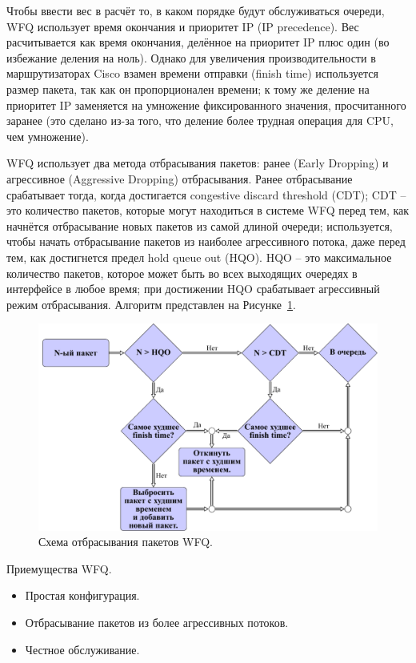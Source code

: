     Чтобы ввести вес в расчёт то, в каком порядке будут обслуживаться очереди,
    WFQ использует время окончания и приоритет IP (IP precedence). Вес расчитывается
    как время окончания, делённое на приоритет IP плюс один (во избежание деления
    на ноль). Однако для увеличения производительности в маршрутизаторах Cisco
    взамен времени отправки (finish time) используется размер пакета, так как он
    пропорционален времени; к тому же деление на приоритет IP заменяется на умножение
    фиксированного значения, просчитанного заранее (это сделано из-за того,
    что деление более трудная операция для CPU, чем умножение).\cite{Vagesna}

    WFQ использует два метода отбрасывания пакетов: ранее (Early Dropping) и агрессивное
    (Aggressive Dropping) отбрасывания. Ранее отбрасывание срабатывает тогда, когда
    достигается congestive discard threshold (CDT); CDT -- это количество пакетов, которые могут
    находиться в системе WFQ перед тем, как начнётся отбрасывание новых пакетов
    из самой длиной очереди; используется, чтобы начать отбрасывание пакетов
    из наиболее агрессивного потока, даже перед тем, как достигнется предел
    hold queue out (HQO). HQO -- это максимальное количество пакетов, которое может быть
    во всех выходящих очередях в интерфейсе в любое время; при достижении HQO
    срабатывает агрессивный режим отбрасывания. Алгоритм представлен на Рисунке~\ref{pic:wfqdropalgo}.
    \cite{wfqdrop}

    \begin{figure}[ht!]
			\center
        \includegraphics{./pdfimages/fwfq_drop.pdf}
        \caption{Схема отбрасывания пакетов WFQ.}
		\label{pic:wfqdropalgo}
    \end{figure}

    Приемущества WFQ.
    \begin{itemize}
        \item Простая конфигурация.
        \item Отбрасывание пакетов из более агрессивных потоков.
		\item Честное обслуживание.
    \end{itemize}

